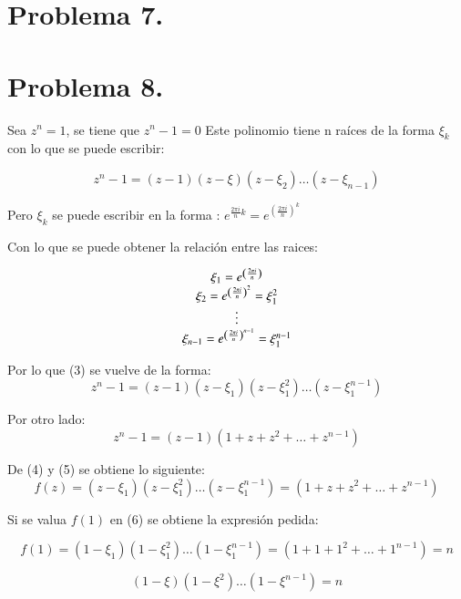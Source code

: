 \documentclass[11pt]{article}
\theoremstyle{Tema} \newtheorem{Tema}{Tema} %
\theoremstyle{Tema} \newtheorem{serie}{Serie}              %
\theoremstyle{Tema} \newtheorem{ejercicio}{Ejercicio}    %
\begin{document}
		\section*{\textbf{Problema 7.} }

	
		
		\section*{\textbf{Problema 8.} }
		 
		
		\begin{exercise}
		Sea $ z^n =1 $, se tiene que $ z^n-1=0 $
		Este polinomio tiene n ra\'ices de la forma $ \xi_k $ con lo que se puede escribir:
		
		\begin{equation}
		z^n-1=(z-1)(z-\xi)(z-\xi_2)\dots(z-\xi_{n-1})
		\end{equation}
		
		Pero $ \xi_k $ se puede escribir en la forma :
		$ e^{\frac{2\pi i}{n}k}= e^{\left(\frac{2\pi i}{n}\right)^k}$ 
		
		Con lo que se puede obtener la relaci\'on entre las raices:
		 
		 
		 \begin{center}
		 	\begin{equation*}
		 	\begin{tabular}{c}
		 	$ \xi_1= e^{\left(\frac{2\pi i}{n}\right)}$\\  
		 	$ \xi_2= e^{\left(\frac{2\pi i}{n}\right)^2}=\xi_1^2$\\ 
		 	$\vdots$\\		 	
		 	$ \xi_{n-1}= e^{\left(\frac{2\pi i}{n}\right)^{n-1}}=\xi_1^{n-1}$\\ 
		 	\end{tabular} 	
		 	\end{equation*}
		 \end{center}
	 
	Por lo que (3) se vuelve de la forma:
	\begin{equation}
	z^n-1=(z-1)(z-\xi_1)(z-\xi_1^2)\dots(z-\xi_1^{n-1})
	\end{equation} 
	
	Por otro lado:
		\begin{equation}
	z^n-1=(z-1)(1+z+z^2+\dots+z^{n-1})
	\end{equation} 
		 
		 
	De (4) y (5) se obtiene lo siguiente:
	\begin{equation}
	f(z)= (z-\xi_1)(z-\xi_1^2)\dots(z-\xi_1^{n-1})=(1+z+z^2+\dots+z^{n-1})
	\end{equation}	 
	
	Si se valua $f(1)$ en (6) se obtiene la expresi\'on pedida:
	
	\begin{equation*}
	f(1)=(1-\xi_1)(1-\xi_1^2)\dots(1-\xi_1^{n-1})=(1+1+1^2+\dots+1^{n-1})=n
	\end{equation*}
	
	\begin{equation}
	(1-\xi)(1-\xi^2)\dots(1-\xi^{n-1})=n
	\end{equation}
		
		\end{exercise}
		
\end{document}

